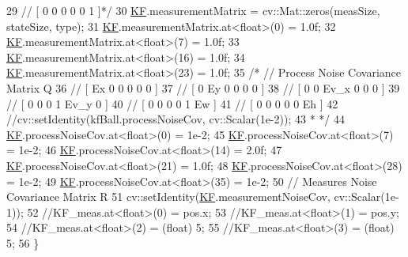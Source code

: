 \begin{DoxyCode}
29 \textcolor{comment}{    // [ 0 0 0 0 0 1 ]*/}
30     \hyperlink{class_kalman_filter_a486d5802080222974f49454c59b71d83}{KF}.measurementMatrix = cv::Mat::zeros(measSize, stateSize, type);
31     \hyperlink{class_kalman_filter_a486d5802080222974f49454c59b71d83}{KF}.measurementMatrix.at<\textcolor{keywordtype}{float}>(0) = 1.0f;
32     \hyperlink{class_kalman_filter_a486d5802080222974f49454c59b71d83}{KF}.measurementMatrix.at<\textcolor{keywordtype}{float}>(7) = 1.0f;
33     \hyperlink{class_kalman_filter_a486d5802080222974f49454c59b71d83}{KF}.measurementMatrix.at<\textcolor{keywordtype}{float}>(16) = 1.0f;
34     \hyperlink{class_kalman_filter_a486d5802080222974f49454c59b71d83}{KF}.measurementMatrix.at<\textcolor{keywordtype}{float}>(23) = 1.0f;
35     \textcolor{comment}{/* // Process Noise Covariance Matrix Q}
36 \textcolor{comment}{    // [ Ex 0  0    0 0    0 ]}
37 \textcolor{comment}{    // [ 0  Ey 0    0 0    0 ]}
38 \textcolor{comment}{    // [ 0  0  Ev\_x 0 0    0 ]}
39 \textcolor{comment}{    // [ 0  0  0    1 Ev\_y 0 ]}
40 \textcolor{comment}{    // [ 0  0  0    0 1    Ew ]}
41 \textcolor{comment}{    // [ 0  0  0    0 0    Eh ]}
42 \textcolor{comment}{    //cv::setIdentity(kfBall.processNoiseCov, cv::Scalar(1e-2));}
43 \textcolor{comment}{    * */}
44     \hyperlink{class_kalman_filter_a486d5802080222974f49454c59b71d83}{KF}.processNoiseCov.at<\textcolor{keywordtype}{float}>(0) = 1e-2;
45     \hyperlink{class_kalman_filter_a486d5802080222974f49454c59b71d83}{KF}.processNoiseCov.at<\textcolor{keywordtype}{float}>(7) = 1e-2;
46     \hyperlink{class_kalman_filter_a486d5802080222974f49454c59b71d83}{KF}.processNoiseCov.at<\textcolor{keywordtype}{float}>(14) = 2.0f;
47     \hyperlink{class_kalman_filter_a486d5802080222974f49454c59b71d83}{KF}.processNoiseCov.at<\textcolor{keywordtype}{float}>(21) = 1.0f;
48     \hyperlink{class_kalman_filter_a486d5802080222974f49454c59b71d83}{KF}.processNoiseCov.at<\textcolor{keywordtype}{float}>(28) = 1e-2;
49     \hyperlink{class_kalman_filter_a486d5802080222974f49454c59b71d83}{KF}.processNoiseCov.at<\textcolor{keywordtype}{float}>(35) = 1e-2;
50     \textcolor{comment}{// Measures Noise Covariance Matrix R}
51     cv::setIdentity(\hyperlink{class_kalman_filter_a486d5802080222974f49454c59b71d83}{KF}.measurementNoiseCov, cv::Scalar(1e-1));
52     \textcolor{comment}{//KF\_meas.at<float>(0) = pos.x;}
53     \textcolor{comment}{//KF\_meas.at<float>(1) = pos.y;}
54     \textcolor{comment}{//KF\_meas.at<float>(2) = (float) 5;}
55     \textcolor{comment}{//KF\_meas.at<float>(3) = (float) 5;}
56 \}
\end{DoxyCode}
\mbox{\label{class_kalman_filter_adddba8eba0982a9042a9524adad3f8a7}} 
